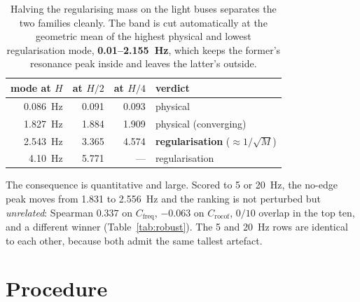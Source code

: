 \documentclass[11pt,a4paper]{article}
\newcommand{\Cf}{\ensuremath{C_{\mathrm{freq}}}}
\newcommand{\Cr}{\ensuremath{C_{\mathrm{rocof}}}}
\begin{document}
\begin{table}[htbp]
\centering
\small
\begin{tabular}{rrrl}
\toprule
mode at $H$ & at $H/2$ & at $H/4$ & verdict \\
\midrule
\SI{0.086}{\hertz} & 0.091 & 0.093 & physical \\
\SI{1.827}{\hertz} & 1.884 & 1.909 & physical (converging) \\
\SI{2.543}{\hertz} & 3.365 & 4.574 & \textbf{regularisation} ($\approx 1/\sqrt{M}$) \\
\SI{4.10}{\hertz}  & 5.771 & ---   & regularisation \\
\bottomrule
\end{tabular}
\caption{Halving the regularising mass on the light buses separates the two
families cleanly. The band is cut automatically at the geometric mean of the
highest physical and lowest regularisation mode, \textbf{0.01--\SI{2.155}{\hertz}},
which keeps the former's resonance peak inside and leaves the latter's outside.}
\label{tab:artefact}
\end{table}

The consequence is quantitative and large. Scored to 5 or \SI{20}{\hertz}, the no-edge peak moves from \SI{1.831}{} to
\SI{2.556}{\hertz} and the ranking is not perturbed but \emph{unrelated}:
Spearman $0.337$ on \Cf{}, $-0.063$ on \Cr{}, $0/10$ overlap in the top ten, and
a different winner (Table~\ref{tab:robust}). The 5 and \SI{20}{\hertz} rows are identical to each other, because both admit the same
tallest artefact.

\section{Procedure}
\end{document}
